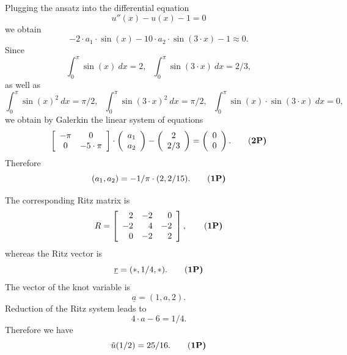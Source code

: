 \begin{loesung}
\begin{teilaufgaben}
\item
Plugging the ansatz into the differential equation
\[
u''(x) - u(x) - 1 = 0
\]
we obtain
\[
-2 \cdot a_1 \cdot \sin(x) - 10 \cdot a_2 \cdot \sin(3 \cdot x) - 1 \approx 0.
\]
Since
\[
\int_0^\pi \sin(x) \ dx = 2, \ \ \ \int_0^\pi \sin(3 \cdot x) \ dx = 2/3,
\]
as well as
\[
\int_0^\pi \sin(x)^2 \ dx = \pi/2, \ \ \ \int_0^\pi \sin(3 \cdot x)^2 \ dx = \pi/2, \ \ \  \int_0^\pi \sin(x) \cdot \sin(3 \cdot x) \ dx = 0,
\]
we obtain by Galerkin the linear system of equations
\begin{equation}
\left[\begin{array}{cc}  -\pi& 0 \\  0& -5 \cdot \pi  \end{array}\right]
\cdot
\left(\begin{array}{r} a_1 \\ a_2 \end{array}\right)
-
\left(\begin{array}{c} 2 \\ 2/3 \end{array}\right)
=
\left(\begin{array}{r} 0 \\ 0 \end{array}\right).
\tag{\bf{2P}}
\end{equation}
Therefore
\begin{equation}
(a_1, a_2) = -1/\pi \cdot (2, 2/15).
\tag{\bf{1P}}
\end{equation}

\item
The corresponding Ritz matrix is
\begin{equation}
R
=
\left[\begin{array}{rrr} 2 & -2 & 0 \\ -2 & 4 & -2  \\ 0 & -2 & 2 \end{array}\right],
\tag{\bf{1P}}
\end{equation}
whereas the Ritz vector is
\begin{equation}
\underline{r}
=
(*,1/4,*).
\tag{\bf{1P}}
\end{equation}
The vector of the knot variable is
\[
\underline{a} = (1, a, 2).
\]
Reduction of the Ritz system leads to  
\[
4 \cdot a - 6 = 1/4.
\]
Therefore we have
\begin{equation}
\tilde u(1/2) = 25/16.
\tag{\bf{1P}}
\end{equation}
\end{teilaufgaben}
\end{loesung}
